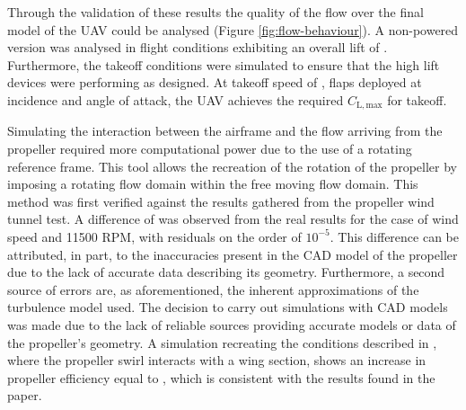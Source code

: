 \documentclass[../../main.tex]{subfiles}
\begin{document}

Through the validation of these results the quality of the flow over the final model of the UAV could be analysed (Figure \ref{fig:flow-behaviour}).
A non-powered version was analysed in flight conditions exhibiting an overall lift of .
Furthermore, the takeoff conditions were simulated to ensure that the high lift devices were performing as designed.
At takeoff speed of , flaps deployed at  incidence and  angle of attack, the UAV achieves the required $C_\mathrm{L,max}$ for takeoff. 


Simulating the interaction between the airframe and the flow arriving from the propeller required more computational power due to the use of a rotating reference frame.
This tool allows the recreation of the rotation of the propeller by imposing a rotating flow domain within the free moving flow domain.
This method was first verified against the results gathered from the propeller wind tunnel test.
A difference of  was observed from the real results for the case of  wind speed and 11500 RPM, with residuals on the order of $10^{-5}$.
This difference can be attributed, in part, to the inaccuracies present in the CAD model of the propeller due to the lack of accurate data describing its geometry.
Furthermore, a second source of errors are, as aforementioned, the inherent approximations of the turbulence model used.
The decision to carry out simulations with CAD models was made due to the lack of reliable sources providing accurate models or data of the propeller's geometry.
A simulation recreating the conditions described in \cite{kroo-86}, where the propeller swirl interacts with a wing section, shows an increase in propeller efficiency equal to , which is consistent with the results found in the paper.

\end{document}
